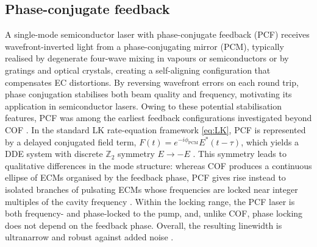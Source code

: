 \subsection*{Phase-conjugate feedback}
\label{subsec:PCF}
%
A single-mode semiconductor laser with phase-conjugate feedback (PCF) receives wavefront-inverted light from a phase-conjugating mirror (PCM), typically realised by degenerate four-wave mixing in vapours or semiconductors or by gratings and optical crystals, creating a self-aligning configuration that compensates EC distortions.
By reversing wavefront errors on each round trip, phase conjugation stabilises both beam quality and frequency, motivating its application in semiconductor lasers.
Owing to these potential stabilisation features, PCF was among the earliest feedback configurations investigated beyond COF \cite{krauskopf1998semiconductor, green2004bifurcation}.
In the standard LK rate-equation framework \eqref{eq:LK}, PCF is represented by a delayed conjugated field term, $F(t) = e^{-i \phi_\text{PCM}} E^*(t-\tau)$, which yields a DDE system with discrete $\mathbb{Z}_2$ symmetry $E \rightarrow -E$ \cite{krauskopf2002routes}.
This symmetry leads to qualitative differences in the mode structure: whereas COF produces a continuous ellipse of ECMs organised by the feedback phase, PCF gives rise instead to isolated branches of pulsating ECMs whose frequencies are locked near integer multiples of the cavity frequency \cite{erneux2003external}.
Within the locking range, the PCF laser is both frequency- and phase-locked to the pump, and, unlike COF, phase locking does not depend on the feedback phase.
Overall, the resulting linewidth is ultranarrow and robust against added noise \cite{green2002global}.
%

